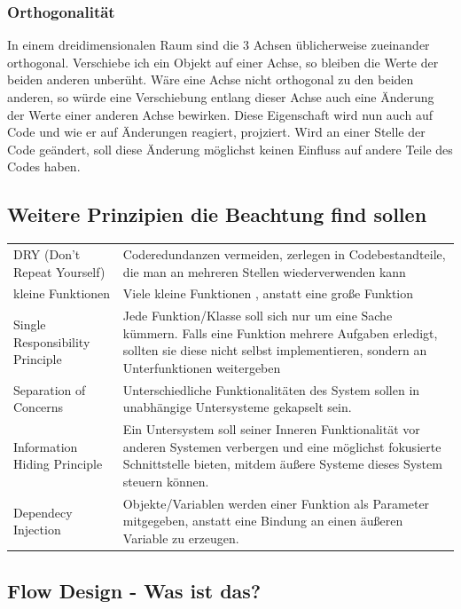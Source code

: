 \documentclass[11pt]{article}
\begin{document}
\subsubsection{Orthogonalität}
\label{sec:orgheadline5}
In einem dreidimensionalen Raum sind die 3 Achsen üblicherweise zueinander
orthogonal. Verschiebe ich ein Objekt auf einer Achse, so bleiben die Werte der
beiden anderen unberüht. Wäre eine Achse nicht orthogonal zu den beiden anderen,
so würde eine Verschiebung entlang dieser Achse auch eine Änderung der Werte
einer anderen Achse bewirken. Diese Eigenschaft wird nun auch auf Code und wie
er auf Änderungen reagiert, projziert. 
Wird an einer Stelle der Code geändert, soll diese Änderung möglichst keinen Einfluss auf
andere Teile des Codes haben.


\subsection{Weitere Prinzipien die Beachtung find sollen}
\label{sec:orgheadline7}

\begin{center}
\begin{tabular}{ll}
DRY  (Don't Repeat Yourself) & Coderedundanzen vermeiden, zerlegen in Codebestandteile, die man an mehreren Stellen wiederverwenden kann\\
kleine Funktionen & Viele kleine Funktionen , anstatt eine große Funktion\\
Single Responsibility Principle & Jede Funktion/Klasse soll sich nur um eine Sache kümmern. Falls eine Funktion mehrere Aufgaben erledigt, sollten sie diese nicht selbst implementieren, sondern an Unterfunktionen weitergeben\\
Separation of Concerns & Unterschiedliche Funktionalitäten des System sollen in unabhängige Untersysteme gekapselt sein.\\
Information Hiding Principle & Ein Untersystem soll seiner Inneren Funktionalität vor anderen Systemen verbergen und eine möglichst fokusierte Schnittstelle bieten, mitdem äußere Systeme dieses System steuern können.\\
Dependecy Injection & Objekte/Variablen werden einer Funktion als Parameter mitgegeben, anstatt eine Bindung an einen äußeren Variable zu erzeugen.\\
\end{tabular}
\end{center}

\subsection{Flow Design - Was ist das?}
\label{sec:orgheadline8}
\end{document}
